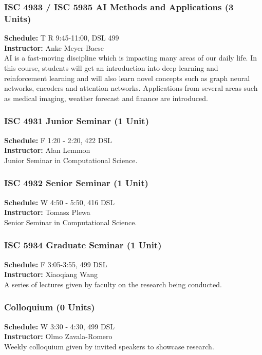 \documentclass[12pt,a4paper]{article}
\begin{document}
\subsubsection*{ISC 4933 / ISC 5935 AI Methods and Applications (3 Units)}
\textbf{Schedule:} T R 9:45-11:00, DSL 499 \\
\textbf{Instructor:} Anke Meyer-Baese \\
AI is a fast-moving discipline which is impacting many areas of our daily life. In this course, students will get an introduction into deep learning and reinforcement learning and will also learn novel concepts such as graph neural networks, encoders and attention networks. Applications from several areas such as medical imaging, weather forecast and finance are introduced.

\subsubsection*{ISC 4931 Junior Seminar (1 Unit)}
\textbf{Schedule:} F 1:20 - 2:20, 422 DSL \\
\textbf{Instructor:} Alan Lemmon \\
Junior Seminar in Computational Science.

\subsubsection*{ISC 4932 Senior Seminar (1 Unit)}
\textbf{Schedule:} W 4:50 - 5:50, 416 DSL \\
\textbf{Instructor:} Tomasz Plewa \\
Senior Seminar in Computational Science.

\subsubsection*{ISC 5934 Graduate Seminar (1 Unit)}
\textbf{Schedule:} F 3:05-3:55, 499 DSL \\
\textbf{Instructor:} Xiaoqiang Wang \\
A series of lectures given by faculty on the research being conducted.

\subsubsection*{Colloquium (0 Units)}
\textbf{Schedule:} W 3:30 - 4:30, 499 DSL \\
\textbf{Instructor:} Olmo Zavala-Romero \\
Weekly colloquium given by invited speakers to showcase research.
\newpage
\end{document}
